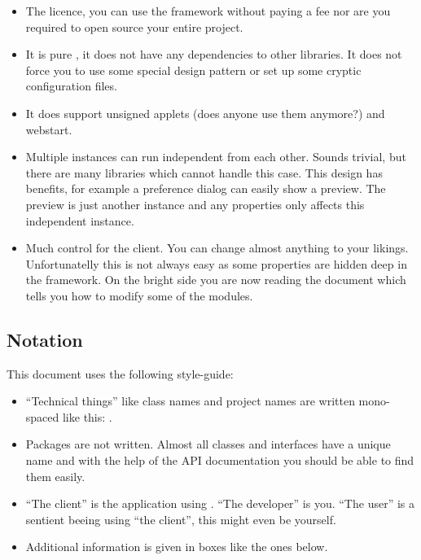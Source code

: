 \begin{itemize}
 \item The licence, you can use the framework without paying a fee nor are you required to open source your entire project.
 \item It is pure , it does not have any dependencies to other libraries. It does not force you to use some special design pattern or set up some cryptic configuration files.
 \item It does support unsigned applets (does anyone use them anymore?) and webstart.
 \item Multiple instances can run independent from each other. Sounds trivial, but there are many libraries which cannot handle this case. This design has benefits, for example a preference dialog can easily show a preview. The preview is just another instance and any properties only affects this independent instance.
 \item Much control for the client. You can change almost anything to your likings. Unfortunatelly this is not always easy as some properties are hidden deep in the framework. On the bright side you are now reading the document which tells you how to modify some of the modules.
\end{itemize}


\subsection{Notation}
This document uses the following style-guide:

\begin{itemize}
 \item ``Technical things'' like class names and project names are written mono-spaced like this: .
 \item Packages are not written. Almost all classes and interfaces have a unique name and with the help of the API documentation you should be able to find them easily.
 \item ``The client'' is the application using . ``The developer'' is you. ``The user'' is a sentient beeing using ``the client'', this might even be yourself.
 \item Additional information is given in boxes like the ones below.
\end{itemize}



